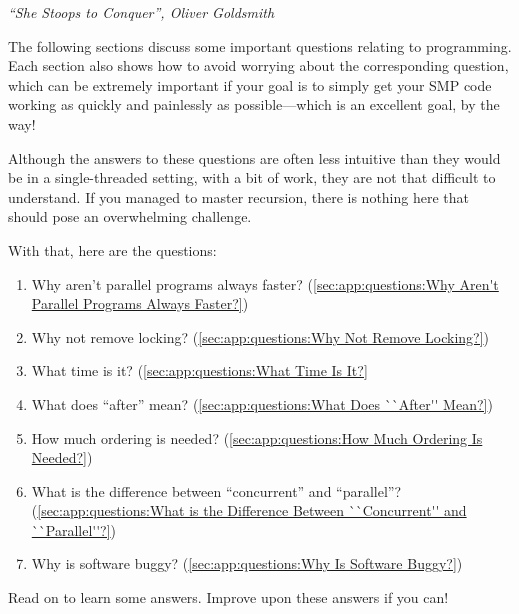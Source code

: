 
%
	 {\emph{``She Stoops to Conquer'', Oliver Goldsmith}}

The following sections discuss some important questions relating to
 programming.
Each section also shows how to avoid worrying about
the corresponding question, which can be extremely important if
your goal is to simply get your SMP code working as quickly and
painlessly as possible---which is an excellent goal, by the way!

Although the answers to these questions are often less
intuitive than they would be in a single-threaded setting,
with a bit of work, they are not that difficult to understand.
If you managed to master recursion, there is nothing here that should
pose an overwhelming challenge.

With that, here are the questions:

\begin{enumerate}
\item	Why aren't parallel programs always faster?
	(\cref{sec:app:questions:Why Aren't Parallel Programs Always Faster?})
\item	Why not remove locking?
	(\cref{sec:app:questions:Why Not Remove Locking?})
\item	What time is it?
	(\cref{sec:app:questions:What Time Is It?}
\item	What does ``after'' mean?
	(\cref{sec:app:questions:What Does ``After'' Mean?})
\item	How much ordering is needed?
	(\cref{sec:app:questions:How Much Ordering Is Needed?})
\item	What is the difference between ``concurrent'' and ``parallel''?
	(\cref{sec:app:questions:What is the Difference Between ``Concurrent'' and ``Parallel''?})
\item	Why is software buggy?
	(\cref{sec:app:questions:Why Is Software Buggy?})
\end{enumerate}

Read on to learn some answers.
Improve upon these answers if you can!









